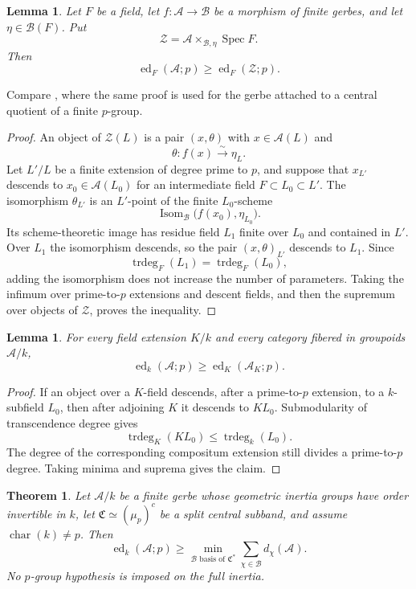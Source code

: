 \documentclass[11pt,reqno]{amsart}
\numberwithin{equation}{section}
\theoremstyle{plain}
\newtheorem{theo}[prop]{Theorem}
\newtheorem{lemm}[prop]{Lemma}
\theoremstyle{definition}
\def\cA{{\mathcal A}}
\def\cB{{\mathcal B}}
\def\cZ{{\mathcal Z}}
\def\fC{{\mathfrak C}}
\def\Spec{{\operatorname{Spec}}}
\def\ed{{\operatorname{ed}}}
\def\trdeg{{\operatorname{trdeg}}}
\begin{document}
\begin{lemm}\label{lem:finite-fiber-ed}
Let $F$ be a field, let $f:\cA\to\cB$ be a morphism of finite gerbes, and
let $\eta\in\cB(F)$.  Put
\[
\cZ=\cA\times_{\cB,\eta}\Spec F.
\]
Then
\[
\ed_F(\cA;p)\ge\ed_F(\cZ;p).
\]
\end{lemm}

Compare \cite[Theorem~4.2]{KM}, where the same proof is
used for the gerbe attached to a central quotient of a finite $p$-group.

\begin{proof}
An object of $\cZ(L)$ is a pair $(x,\theta)$ with $x\in\cA(L)$ and
\[
\theta:f(x)\xrightarrow{\sim}\eta_L.
\]
Let $L'/L$ be a finite extension of degree prime to $p$, and suppose that
$x_{L'}$ descends to $x_0\in\cA(L_0)$ for an intermediate field
$F\subset L_0\subset L'$.  The isomorphism $\theta_{L'}$ is an $L'$-point
of the finite $L_0$-scheme
\[
\operatorname{Isom}_{\cB}\bigl(f(x_0),\eta_{L_0}\bigr).
\]
Its scheme-theoretic image has residue field $L_1$ finite over $L_0$ and
contained in $L'$.  Over $L_1$ the isomorphism descends, so the pair
$(x,\theta)_{L'}$ descends to $L_1$.  Since
\[
\trdeg_F(L_1)=\trdeg_F(L_0),
\]
adding the isomorphism does not increase the number of parameters.  Taking
the infimum over prime-to-$p$ extensions and descent fields, and then the
supremum over objects of $\cZ$, proves the inequality.
\end{proof}

\begin{lemm}\label{lem:ed-base-change}
For every field extension $K/k$ and every category fibered in groupoids
$\cA/k$,
\[
\ed_k(\cA;p)\ge\ed_K(\cA_K;p).
\]
\end{lemm}

\begin{proof}
If an object over a $K$-field descends, after a prime-to-$p$ extension, to a
$k$-subfield $L_0$, then after adjoining $K$ it descends to $KL_0$.
Submodularity of transcendence degree gives
\[
\trdeg_K(KL_0)\le\trdeg_k(L_0).
\]
The degree of the corresponding compositum extension still divides a
prime-to-$p$ degree.  Taking minima and suprema gives the claim.
\end{proof}

\begin{theo}
\label{thm:central-rank-lower-bound}
Let $\cA/k$ be a finite gerbe whose geometric inertia groups have order
invertible in $k$, let $\fC\simeq(\mu_p)^c$ be a split central subband,
and assume $\operatorname{char}(k)\ne p$.  Then
\begin{equation}\label{eq:central-rank-lower-bound}
\ed_k(\cA;p)\ge
\min_{\mathcal B\text{ basis of }\fC^*}
\sum_{\chi\in\mathcal B}d_\chi(\cA).
\end{equation}
No $p$-group hypothesis is imposed on the full inertia.
\end{theo}
\end{document}
